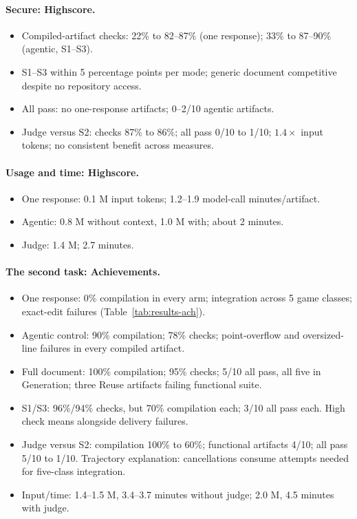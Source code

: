 \paragraph{Secure: Highscore.}
\begin{itemize}
\item Compiled-artifact checks: 22\% to 82--87\% (one response);
33\% to 87--90\% (agentic, S1--S3).
\item S1--S3 within 5 percentage points per mode;
generic document competitive despite no repository access.
\item All pass: no one-response artifacts; 0--2/10 agentic artifacts.
\item Judge versus S2: checks 87\% to 86\%; all pass 0/10 to 1/10;
$1.4\times$ input tokens; no consistent benefit across measures.
\end{itemize}

\paragraph{Usage and time: Highscore.}
\begin{itemize}
\item One response: 0.1 M input tokens; 1.2--1.9 model-call minutes/artifact.
\item Agentic: 0.8 M without context, 1.0 M with; about 2 minutes.
\item Judge: 1.4 M; 2.7 minutes.
\end{itemize}

\paragraph{The second task: Achievements.}
\begin{itemize}
\item One response: 0\% compilation in every arm; integration across
5 game classes; exact-edit failures (Table~\ref{tab:results-ach}).
\item Agentic control: 90\% compilation; 78\% checks;
point-overflow and oversized-line failures in every compiled artifact.
\item Full document: 100\% compilation; 95\% checks; 5/10 all pass,
all five in Generation; three Reuse artifacts failing functional suite.
\item S1/S3: 96\%/94\% checks, but 70\% compilation each;
3/10 all pass each. High check means alongside delivery failures.
\item Judge versus S2: compilation 100\% to 60\%; functional artifacts
4/10; all pass 5/10 to 1/10. Trajectory explanation: cancellations
consume attempts needed for five-class integration.
\item Input/time: 1.4--1.5 M, 3.4--3.7 minutes without judge;
2.0 M, 4.5 minutes with judge.
\end{itemize}
